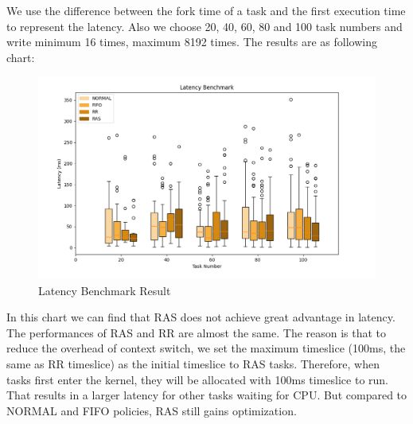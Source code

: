 We use the difference between the fork time of a task and the first execution time to represent the latency. Also we choose 20, 40, 60, 80 and 100 task numbers and write minimum 16 times, maximum 8192 times. The results are as following chart:

\begin{figure}[!htp]
  \centering
  \includegraphics[width=13.5cm]{figures/latencybox.png}
  \caption{Latency Benchmark Result}
  \label{fig:turnaroundbox}
\end{figure}

In this chart we can find that RAS does not achieve great advantage in latency. The performances of RAS and RR are almost the same. The reason is that to reduce the overhead of context switch, we set the maximum timeslice (100ms, the same as RR timeslice) as the initial timeslice to RAS tasks. Therefore, when tasks first enter the kernel, they will be allocated with 100ms timeslice to run. That results in a larger latency for other tasks waiting for CPU. But compared to NORMAL and FIFO policies, RAS still gains optimization.


